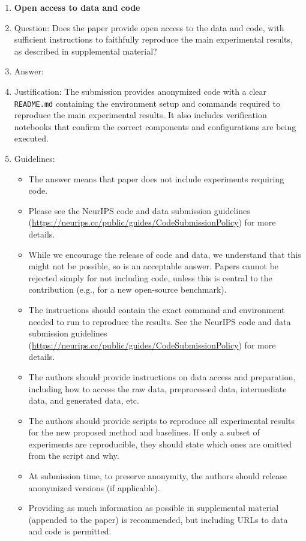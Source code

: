 \documentclass{article}
\begin{document}
\begin{enumerate}
\item {\bf Open access to data and code}
    \item[] Question: Does the paper provide open access to the data and code, with sufficient instructions to faithfully reproduce the main experimental results, as described in supplemental material?
    \item[] Answer: \answerYes{}
    \item[] Justification: The submission provides anonymized code with a clear \texttt{README.md} containing the environment
  setup and commands required to reproduce the main experimental results. It also includes verification notebooks that confirm the
  correct components and configurations are being executed.
    \item[] Guidelines:
    \begin{itemize}
        \item The answer \answerNA{} means that paper does not include experiments requiring code.
        \item Please see the NeurIPS code and data submission guidelines (\url{https://neurips.cc/public/guides/CodeSubmissionPolicy}) for more details.
        \item While we encourage the release of code and data, we understand that this might not be possible, so \answerNo{} is an acceptable answer. Papers cannot be rejected simply for not including code, unless this is central to the contribution (e.g., for a new open-source benchmark).
        \item The instructions should contain the exact command and environment needed to run to reproduce the results. See the NeurIPS code and data submission guidelines (\url{https://neurips.cc/public/guides/CodeSubmissionPolicy}) for more details.
        \item The authors should provide instructions on data access and preparation, including how to access the raw data, preprocessed data, intermediate data, and generated data, etc.
        \item The authors should provide scripts to reproduce all experimental results for the new proposed method and baselines. If only a subset of experiments are reproducible, they should state which ones are omitted from the script and why.
        \item At submission time, to preserve anonymity, the authors should release anonymized versions (if applicable).
        \item Providing as much information as possible in supplemental material (appended to the paper) is recommended, but including URLs to data and code is permitted.
    \end{itemize}



\end{enumerate}
\end{document}
